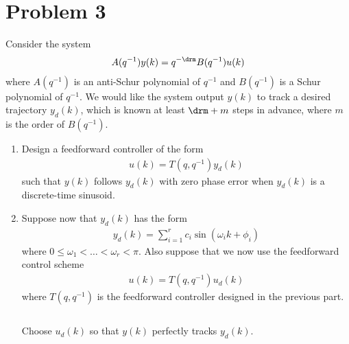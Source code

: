 \section*{Problem 3}

Consider the system
\begin{align*}
    A(q^{-1}) y(k) = q^{-\drm} B(q^{-1}) u(k)
\end{align*}
where $A(q^{-1})$ is an anti-Schur polynomial of $q^{-1}$ and $B(q^{-1})$ is a Schur polynomial of $q^{-1}$. We would like the system output $y(k)$ to track a desired trajectory $y_d(k)$, which is known at least $\drm + m$ steps in advance, where $m$ is the order of $B(q^{-1})$.

\begin{enumerate}
    \item
    Design a feedforward controller of the form
    \begin{align*}
        u(k) = T(q,q^{-1}) y_d(k)
    \end{align*}
    such that $y(k)$ follows $y_d(k)$ with zero phase error when $y_d(k)$ is a discrete-time sinusoid.

    \item
    Suppose now that $y_d(k)$ has the form
    \begin{align*}
        y_d(k) = \sum_{i=1}^r c_i \sin(\omega_i k + \phi_i)
    \end{align*}
    where $0 \leq \omega_1 < \ldots < \omega_r < \pi$. Also suppose that we now use the feedforward control scheme
    \begin{align*}
        u(k) = T(q,q^{-1}) u_d(k)
    \end{align*}
    where $T(q,q^{-1})$ is the feedforward controller designed in the previous part.

    $\,$

    Choose $u_d(k)$ so that $y(k)$ perfectly tracks $y_d(k)$.


\end{enumerate}



